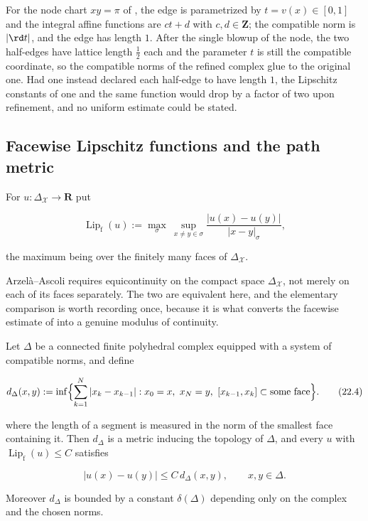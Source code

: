 \begin{example}
\label{ex:ch22-edge-normalization}
For the node chart \(xy=\pi\) of , the edge is
parametrized by \(t=v(x)\in[0,1]\) and the integral affine functions are
\(ct+d\) with \(c,d\in\mathbf Z\); the compatible norm is \(|\rd t|\), and the
edge has length \(1\).  After the single blowup of the node, the two
half-edges have lattice length \(\tfrac12\) each and the parameter \(t\) is
still the compatible coordinate, so the compatible norms of the refined
complex glue to the original one.  Had one instead declared each half-edge
to have length \(1\), the Lipschitz constants of one and the same function
would drop by a factor of two upon refinement, and no uniform estimate could
be stated.
\end{example}

\subsection{Facewise Lipschitz functions and the path metric}

\begin{definition}
\label{def:ch22-facewise-lipschitz}
For \(u:\Delta_{\mathcal X}\to\mathbf R\) put

\[
 \operatorname{Lip}_{\mathrm f}(u)
 :=\max_{\sigma}\ \sup_{x\neq y\in\sigma}
       \frac{|u(x)-u(y)|}{|x-y|_\sigma},
\tag{22.3}\label{eq:ch22-facewise-lipschitz}
\]

the maximum being over the finitely many faces of
\(\Delta_{\mathcal X}\).
\end{definition}

Arzel\`a--Ascoli requires equicontinuity on the compact space
\(\Delta_{\mathcal X}\), not merely on each of its faces separately.  The two
are equivalent here, and the elementary comparison is worth recording once,
because it is what converts the facewise estimate of
 into a genuine modulus of continuity.

\begin{lemma}
\label{lem:ch22-path-metric}
Let \(\Delta\) be a connected finite polyhedral complex equipped with a
system of compatible norms, and define

\[
 d_\Delta(x,y):=\inf\Bigl\{\sum_{k=1}^{N}|x_{k}-x_{k-1}|:
     x_0=x,\ x_N=y,\ [x_{k-1},x_k]\subset\text{some face}\Bigr\}.
\tag{22.4}\label{eq:ch22-path-metric}
\]

where the length of a segment is measured in the norm of the smallest face
containing it.  Then \(d_\Delta\) is a metric inducing the topology of
\(\Delta\), and every \(u\) with
\(\operatorname{Lip}_{\mathrm f}(u)\leq C\) satisfies

\[
     |u(x)-u(y)|\leq C\,d_\Delta(x,y),
     \qquad x,y\in\Delta .
\tag{22.5}\label{eq:ch22-global-lipschitz}
\]

Moreover \(d_\Delta\) is bounded by a constant \(\delta(\Delta)\) depending
only on the complex and the chosen norms.
\end{lemma}

